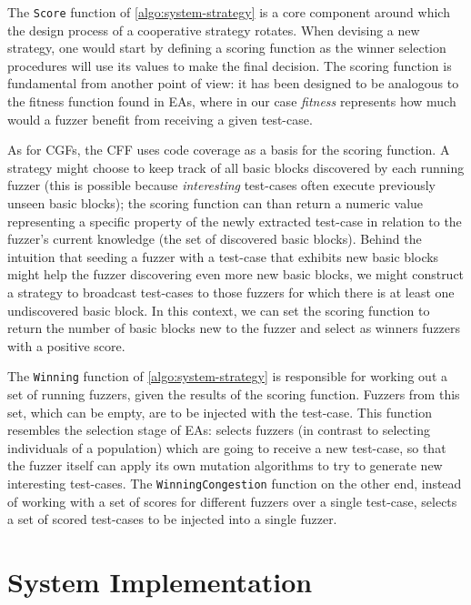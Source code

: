 The \texttt{Score} function of \autoref{algo:system-strategy} is a core
component around which the design process of a cooperative strategy rotates.
When devising a new strategy, one would start by defining a scoring function as
the winner selection procedures will use its values to make the final decision.
The scoring function is fundamental from another point of view: it has been
designed to be analogous to the fitness function found in \acp{EA}, where in our
case \emph{fitness} represents how much would a fuzzer benefit from receiving a
given test-case.

As for \acp{CGF}, the \ac{CFF} uses code coverage as a basis for the scoring
function. A strategy might choose to keep track of all basic blocks discovered
by each running fuzzer (this is possible because \emph{interesting} test-cases
often execute previously unseen basic blocks); the scoring function can than
return a numeric value representing a specific property of the newly extracted
test-case in relation to the fuzzer's current knowledge (the set of discovered
basic blocks). Behind the intuition that seeding a fuzzer with a test-case that
exhibits new basic blocks might help the fuzzer discovering even more new basic
blocks, we might construct a strategy to broadcast test-cases to those fuzzers
for which there is at least one undiscovered basic block. In this context, we
can set the scoring function to return the number of basic blocks new to the
fuzzer and select as winners fuzzers with a positive score. %

The \texttt{Winning} function of \autoref{algo:system-strategy} is
responsible for working out a set of running fuzzers, given the results of the
scoring function. Fuzzers from this set, which can be empty, are to be injected
with the test-case. This function resembles the selection stage of \acp{EA}:
selects fuzzers (in contrast to selecting individuals of a population) which are
going to receive a new test-case, so that the fuzzer itself can apply its own
mutation algorithms to try to generate new interesting test-cases. The
\texttt{WinningCongestion} function on the other end, instead of working with a
set of scores for different fuzzers over a single test-case, selects a set of
scored test-cases to be injected into a single fuzzer.

\section{System Implementation}
\label{sec:system-impl}

